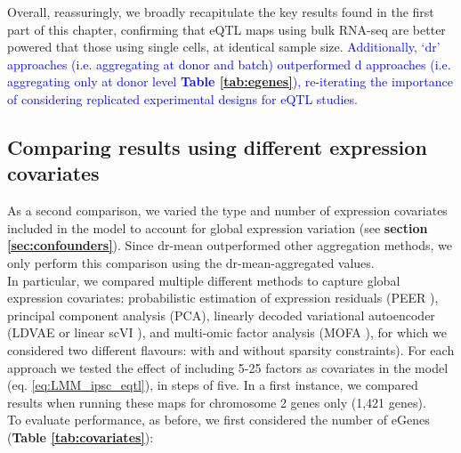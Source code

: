 Overall, reassuringly, we broadly recapitulate the key results found in the first part of this chapter, confirming that eQTL maps using bulk RNA-seq are better powered that those using single cells, at identical sample size.
\textcolor{blue}{Additionally, `dr' approaches (i.e. aggregating at donor and batch) outperformed d approaches (i.e. aggregating only at donor level \textbf{Table \ref{tab:egenes}}), re-iterating the importance of considering replicated experimental designs for eQTL studies.}



\subsection{Comparing results using different expression covariates}


As a second comparison, we varied the type and number of expression covariates included in the model to account for global expression variation (see \textbf{section \ref{sec:confounders}}).
Since dr-mean outperformed other aggregation methods, we only perform this comparison using the dr-mean-aggregated values. \\

In particular, we compared multiple different methods to capture global expression covariates: probabilistic estimation of
expression residuals (PEER \cite{stegle2010bayesian,stegle2012using}), principal component analysis (PCA), linearly decoded
variational autoencoder (LDVAE or linear scVI \cite{svensson2020interpretable}), and multi-omic factor analysis (MOFA \cite{argelaguet2018multi}), for which we considered two different flavours: with and without sparsity constraints).
For each approach we tested the effect of including 5-25 factors as covariates in the model (eq. \eqref{eq:LMM_ipsc_eqtl}), in steps of five.
In a first instance, we compared results when running these maps for chromosome 2 genes only (1,421 genes). \\

To evaluate performance, as before, we first considered the number of eGenes (\textbf{Table \ref{tab:covariates}}):

